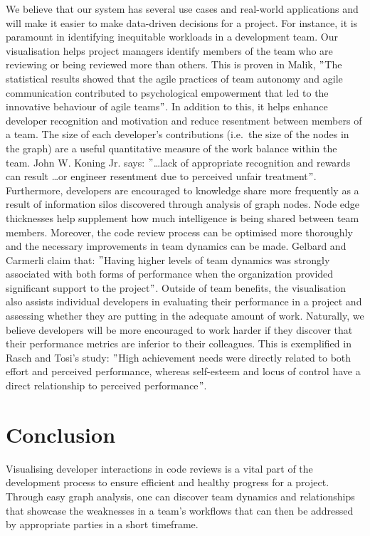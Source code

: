 \documentclass[sigconf]{acmart}
\begin{document}
We believe that our system has several use cases and real-world applications and will make it easier to make data-driven decisions for a project.
For instance,
it is paramount in identifying inequitable workloads in a development team.
Our visualisation helps project managers identify members of the team who are reviewing or being reviewed more than others.
This is proven in Malik, \("\)The statistical results showed that the agile practices of team autonomy and agile communication contributed to psychological empowerment that led to the innovative behaviour of agile teams\("\)\cite{malik2021agile}.
In addition to this,
it helps enhance developer recognition and motivation and reduce resentment between members of a team.
The size of each developer's contributions (i.e.\ the size of the nodes in the graph) are a useful quantitative measure of the work balance within the team.
John W. Koning Jr. says: \("\)\ldots lack of appropriate recognition and rewards can result \ldots or engineer resentment due to perceived unfair treatment\("\)\cite{koning1993three}.
Furthermore,
developers are encouraged to knowledge share more frequently as a result of information silos discovered through analysis of graph nodes.
Node edge thicknesses help supplement how much intelligence is being shared between team members.
Moreover,
the code review process can be optimised more thoroughly and the necessary improvements in team dynamics can be made.
Gelbard and Carmerli claim that: \("\)Having higher levels of team dynamics was strongly associated with both forms of performance when the organization provided significant support to the project\("\)\cite{gelbard2009interactive}.
Outside of team benefits,
the visualisation also assists individual developers in evaluating their performance in a project and assessing whether they are putting in the adequate amount of work.
Naturally, we believe developers will be more encouraged to work harder if they discover that their performance metrics are inferior to their colleagues.
This is exemplified in Rasch and Tosi's study: \("\)High achievement needs were directly related to both effort and perceived performance,
whereas self-esteem and locus of control have a direct relationship to perceived performance\("\)\cite{rasch1992factors}.


\section{Conclusion}
\label{sec:conclusion}

Visualising developer interactions in code reviews is a vital part of the development process
to ensure efficient and healthy progress for a project.
Through easy graph analysis,
one can discover team dynamics and relationships
that showcase the weaknesses in a team's workflows
that can then be addressed by appropriate parties in a short timeframe.
\end{document}
